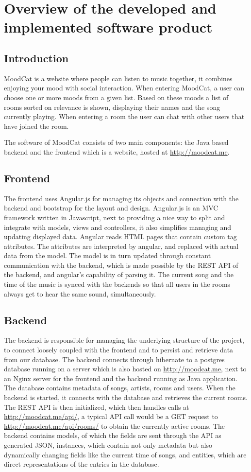 \chapter{Overview of the developed and implemented software product}

\section{Introduction}
MoodCat is a website where people can listen to music together, it combines enjoying your mood with social interaction.
When entering MoodCat, a user can choose one or more moods from a given list. Based on these moods a list of rooms
sorted on relevance is shown, displaying their names and the song currently playing. When entering a room
the user can chat with other users that have joined the room.

The software of MoodCat consists of two main components: the Java based backend and the frontend which is a website,
hosted at \url{http://moodcat.me}.

\section{Frontend}
The frontend uses Angular.js for managing its objects and connection with the backend and bootstrap
for the layout and design.
Angular.js is an MVC framework written in Javascript, next to providing a nice way to split
and integrate with models, views and controllers, it also simplifies managing and updating displayed data.
Angular reads HTML pages that contain custom tag attributes. The attributes are interpreted by angular, and
replaced with actual data from the model.
The model is in turn updated through constant communication with the backend, which is made possible by the REST API of the backend,
and angular's capability of parsing it. The current song and the time of the music is synced with the backends so that
all users in the rooms always get to hear the same sound, simultaneously.

\section{Backend}
The backend is responsible for managing the underlying structure of the project, to
connect loosely coupled with the frontend and to persist and retrieve data from our database.
The backend connects through hibernate to a postgres database running on a server which is also hosted on \url{http://moodcat.me}, next to an Nginx server for the
frontend and the backend running as Java application. The database contains metadata of songs, artists, rooms and users. When the
backend is started, it connects with the database and retrieves the current rooms. The REST API is then initialized, which then
handles calls at \url{http://moodcat.me/api/}, a typical API call would be a GET request to \url{http://moodcat.me/api/rooms/} to obtain the currently
active rooms.
The backend contains models, of which the fields are sent through the API as generated JSON, instances, which contain not only metadata but also
dynamically changing fields like the current time of songs, and entities, which are direct representations of the entries in the database.

